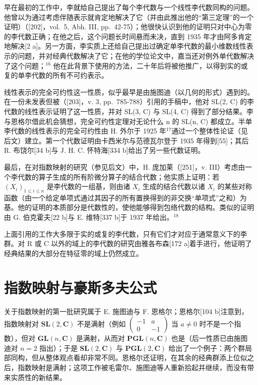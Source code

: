 早在最初的工作中，李就给自己提出了每个李代数与一个线性李代数同构的问题。他曾以为通过考虑伴随表示就肯定地解决了它（并由此推出他的“第三定理”的一个证明）（{[}202{]}，vol.~5, Abh. III, pp.~42-75）；他很快认识到他的证明只对中心为零的李代数正确；在他之后，这个问题长时间悬而未决，直到 1935 年才由阿多肯定地解决{[}2 a{]}。另一方面，李实质上还给自己提出过确定单李代数的最小维数线性表示的问题，并对经典代数解决了它；在他的学位论文中，嘉当还对例外单代数解决了这个问题；\(^{16}\) 他在此背景下使用的方法，二十年后将被他推广，以得到实的或复的单李代数的所有不可约表示。

线性表示的完全可约性这一性质，似乎最早是由施图迪（以几何的形式）遇到的。在一份未发表但被（{[}203{]}，v. 3, pp.~785-788）引用的手稿中，他对 SL(2, C) 的李代数的线性表示证明了这一性质，并对 SL(3, C) 与 SL(4, C) 得到了部分结果。李与恩格尔借此机会猜想，完全可约性定理对无论什么 n 的 SL(n, C) 都成立。半单李代数的线性表示的完全可约性由 H. 外尔于 1925 年\(^{17}\)通过一个整体性论证（见后文）建立。第一个代数证明由卡西米尔与范德瓦尔登于 1935 年得到{[}55{]}；其后 R. 布饶尔{[}34 b{]}与 J. H. C. 怀特海{[}334 b{]}给出了另一些代数证明。

最后，在对指数映射的研究（参见后文）中，H. 庞加莱（{[}251{]}，v. III）考虑由一个李代数的算子生成的所有阶微分算子的结合代数；他实质上证明：若 \((X_{i})_{1\leq i\leq n}\) 是李代数的一组基，则由诸 \(X_{i}\) 生成的结合代数以诸 \(X_{i}\) 的某些对称函数（由一个给定单项式通过其因子的所有置换得到的非交换“单项式”之和）为基。他的证明的本质部分是代数性的，使他能够得到包络代数的结构。类似的证明由 G. 伯克霍夫{[}22 b{]}与 E. 维特{[}337 b{]}于 1937 年给出。\(^{18}\)

上面引用的工作大多限于实的或复的李代数，只有它们才对应于通常意义下的李群。对 R 或 C 以外的域上的李代数的研究由雅各布森{[}172 a{]}着手进行，他证明了经典结果的大部分在特征零的域上仍然成立。

\section{指数映射与豪斯多夫公式}

关于指数映射的第一批研究属于 E. 施图迪与 F. 恩格尔；恩格尔{[}104 b{]}注意到，指数映射对 \(\mathbf{SL}(2, \mathbf{C})\) 不是满射（例如 \(\left( \begin{array}{cc} -1 & a \\ 0 & -1 \end{array} \right)\) 当 \(a \neq 0\) 时不是一个指数），但对 \(\mathbf{GL}(n, \mathbf{C})\) 是满射，从而对 \(\mathbf{PGL}(n, \mathbf{C})\) 也是（后一性质已由施图迪对 \(n = 2\) 指出）；于是 \(\mathbf{SL}(2, \mathbf{C})\) 与 \(\mathbf{PGL}(2, \mathbf{C})\) 给出了一个例子：两个群局部同构，但从整体观点看却非常不同。恩格尔还证明，在其余的经典群添上位似之后，指数映射是满射；这项工作被毛雷尔、施图迪等人重新拾起并继续，而没有带来实质性的新结果。

